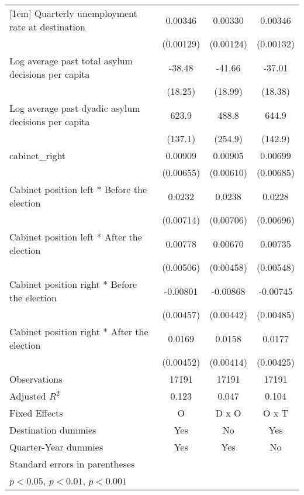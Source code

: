 \begin{table}[htbp]
\begin{tabular}{l*{3}{c}}
[1em]
Quarterly unemployment rate at destination&     0.00346\sym{*}  &     0.00330\sym{*}  &     0.00346\sym{*}  \\
                    &   (0.00129)         &   (0.00124)         &   (0.00132)         \\
[1em]
Log average past total asylum decisions per capita&      -38.48\sym{*}  &      -41.66\sym{*}  &      -37.01\sym{*}  \\
                    &     (18.25)         &     (18.99)         &     (18.38)         \\
[1em]
Log average past dyadic asylum decisions per capita&       623.9\sym{***}&       488.8         &       644.9\sym{***}\\
                    &     (137.1)         &     (254.9)         &     (142.9)         \\
[1em]
cabinet\_right       &     0.00909         &     0.00905         &     0.00699         \\
                    &   (0.00655)         &   (0.00610)         &   (0.00685)         \\
[1em]
Cabinet position left * Before the election&      0.0232\sym{**} &      0.0238\sym{**} &      0.0228\sym{**} \\
                    &   (0.00714)         &   (0.00706)         &   (0.00696)         \\
[1em]
Cabinet position left * After the election&     0.00778         &     0.00670         &     0.00735         \\
                    &   (0.00506)         &   (0.00458)         &   (0.00548)         \\
[1em]
Cabinet position right * Before the election&    -0.00801         &    -0.00868         &    -0.00745         \\
                    &   (0.00457)         &   (0.00442)         &   (0.00485)         \\
[1em]
Cabinet position right * After the election&      0.0169\sym{***}&      0.0158\sym{***}&      0.0177\sym{***}\\
                    &   (0.00452)         &   (0.00414)         &   (0.00425)         \\
\hline
Observations        &       17191         &       17191         &       17191         \\
Adjusted \(R^{2}\)  &       0.123         &       0.047         &       0.104         \\
Fixed Effects       &           O         &       D x O         &       O x T         \\
Destination dummies &         Yes         &          No         &         Yes         \\
Quarter-Year dummies&         Yes         &         Yes         &          No         \\
\hline\hline
\multicolumn{4}{l}{\footnotesize Standard errors in parentheses}\\
\multicolumn{4}{l}{\footnotesize \sym{*} \(p<0.05\), \sym{**} \(p<0.01\), \sym{***} \(p<0.001\)}\\
\end{tabular}
\end{table}
